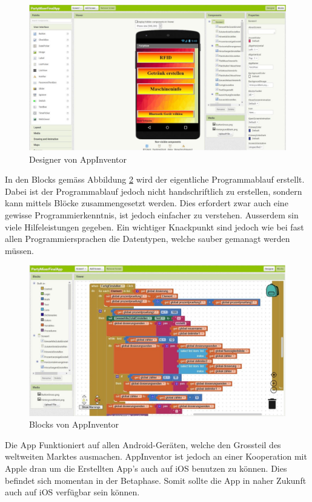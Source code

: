 \newpage

\begin{figure}[h!]
	\centering
	\includegraphics[width=\textwidth]{graphics/AppInventorDesigner}
	\caption{Designer von AppInventor}
	\label{fig:AppInventorDesigner}
\end{figure}

In den Blocks gemäss Abbildung \ref{fig:AppInventorBlocks} wird der eigentliche Programmablauf erstellt. Dabei ist der Programmablauf jedoch nicht handschriftlich zu erstellen, sondern kann mittels Blöcke zusammengesetzt werden. Dies erfordert zwar auch eine gewisse Programmierkenntnis, ist jedoch einfacher zu verstehen. Ausserdem sin viele Hilfeleistungen gegeben. Ein wichtiger Knackpunkt sind jedoch wie bei fast allen Programmiersprachen die Datentypen, welche sauber gemanagt werden müssen.

\begin{figure}[h!]
	\centering
	\includegraphics[width=\textwidth]{graphics/AppInventorBlocks}
	\caption{Blocks von AppInventor}
	\label{fig:AppInventorBlocks}
\end{figure}

Die App Funktioniert auf allen Android-Geräten, welche den Grossteil des weltweiten Marktes ausmachen. AppInventor ist jedoch an einer Kooperation mit Apple dran um die Erstellten App's auch auf iOS benutzen zu können. Dies befindet sich momentan in der Betaphase. Somit sollte die App in naher Zukunft auch auf iOS verfügbar sein können.




 
